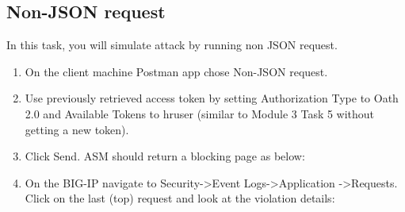 \documentclass[letterpaper,10pt,english]{sphinxmanual}
\begin{document}
\subsection{Non-JSON request}
\label{\detokenize{class1/module4/module4:non-json-request}}
In this task, you will simulate attack by running non JSON request.
\begin{enumerate}
\item {} 
On the client machine Postman app chose Non-JSON request.

\item {} 
Use previously retrieved access token by setting Authorization Type
to Oath 2.0 and Available Tokens to hruser (similar to Module 3 Task
5 without getting a new token).

\item {} 
Click Send. ASM should return a blocking page as below:

\end{enumerate}
\begin{quote}

\noindent{}
\end{quote}
\begin{enumerate}
\setcounter{enumi}{3}
\item {} 
On the BIG-IP navigate to Security-\textgreater{}Event Logs-\textgreater{}Application
-\textgreater{}Requests. Click on the last (top) request and look at the violation
details:

\end{enumerate}
\begin{quote}

\noindent{}
\end{quote}
\end{document}
